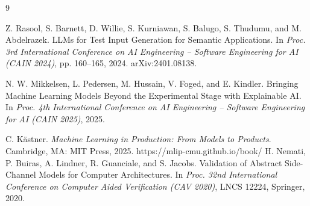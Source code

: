 \documentclass[11pt]{article}
\begin{document}
\begin{thebibliography}{9}

 Z. Rasool, S. Barnett, D. Willie, S. Kurniawan, S. Balugo, S. Thudumu, and M. Abdelrazek. LLMs for Test Input Generation for Semantic Applications. In \emph{Proc. 3rd International Conference on AI Engineering -- Software Engineering for AI (CAIN 2024)}, pp. 160--165, 2024. arXiv:2401.08138.

 N. W. Mikkelsen, L. Pedersen, M. Hussain, V. Foged, and E. Kindler. Bringing Machine Learning Models Beyond the Experimental Stage with Explainable AI. In \emph{Proc. 4th International Conference on AI Engineering -- Software Engineering for AI (CAIN 2025)}, 2025.

 C. K{\"a}stner. \emph{Machine Learning in Production: From Models to Products}. Cambridge, MA: MIT Press, 2025. https://mlip-cmu.github.io/book/
 H. Nemati, P. Buiras, A. Lindner, R. Guanciale, and S. Jacobs. Validation of Abstract Side-Channel Models for Computer Architectures. In \emph{Proc. 32nd International Conference on Computer Aided Verification (CAV 2020)}, LNCS 12224, Springer, 2020.

\end{thebibliography}
\end{document}
